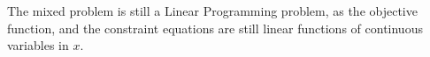 The mixed problem is still a Linear Programming problem, as the objective
function, and the constraint equations are still linear functions of continuous
variables in $x$.
